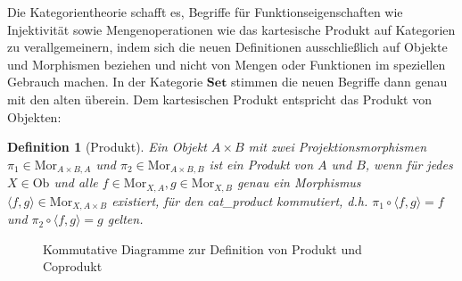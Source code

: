 \documentclass[a4paper, bibgerm]{article}
\newcommand\abb{}
\newtheorem{defi}{Definition}
\begin{document}
Die Kategorientheorie schafft es, Begriffe für Funktionseigenschaften
wie Injektivität sowie Mengenoperationen wie das kartesische Produkt auf
Kategorien zu verallgemeinern, indem sich die neuen Definitionen
ausschließlich auf Objekte und Morphismen beziehen und nicht von Mengen
oder Funktionen im speziellen Gebrauch machen. In der Kategorie
$\mathbf{Set}$ stimmen die neuen Begriffe dann genau mit den alten
überein. Dem kartesischen Produkt entspricht das Produkt von Objekten:

\begin{defi}[Produkt]
  Ein Objekt $A \times B$ mit zwei Projektionsmorphismen $\pi_1
  \in \mathrm{Mor}_{A \times B,A}$ und $\pi_2 \in \mathrm{Mor}_{A \times
    B,B}$ ist ein Produkt von $A$ und $B$, wenn für jedes $X \in
  \mathrm{Ob}$ und alle $f \in \mathrm{Mor}_{X,A},g \in
  \mathrm{Mor}_{X,B}$ genau ein Morphismus
  $\langle f,g \rangle \in \mathrm{Mor}_{X,A \times B}$ existiert, für den \abb{cat_product} kommutiert, d.h. 
  $\pi_1 \circ \langle f,g \rangle = f$ und $\pi_2 \circ \langle f,g \rangle = g$ gelten.
\end{defi}

\begin{figure}
  \centering
  \caption{Kommutative Diagramme zur Definition von Produkt und Coprodukt}
\end{figure}
\end{document}
